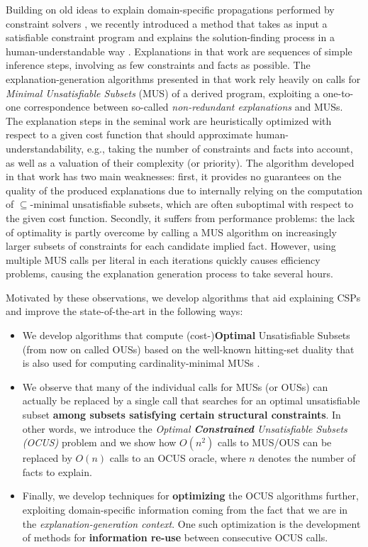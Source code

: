 
Building on old ideas to explain domain-specific propagations performed by constraint solvers  \cite{sqalli1996inference,freuder2001explanation}, we recently introduced a 
method that takes as input a satisfiable constraint program and explains the solution-finding process in a human-understandable way  \cite{ecai/BogaertsGCG20}. 
Explanations in that work are sequences of simple inference steps, involving as few constraints and facts as possible. 
The explanation-generation algorithms presented in that work rely heavily on calls for  \emph{Minimal Unsatisfiable Subsets} (MUS) \cite{marques2010minimal} of a derived program, exploiting a one-to-one correspondence between so-called \emph{non-redundant explanations} and MUSs.
The explanation steps in the seminal work are heuristically optimized with respect to a given cost function that should approximate human-understandability, e.g., taking the number of constraints and facts into account, as well as a valuation of their complexity (or priority). 
The algorithm developed in that work has two main weaknesses: first, it provides no guarantees on the quality of the produced explanations due to internally relying on the computation of $\subseteq$-minimal unsatisfiable subsets, which are often suboptimal with respect to the given cost function. 
Secondly, it suffers from performance problems: the lack of optimality is partly overcome by calling a MUS algorithm on increasingly larger subsets of constraints for each candidate implied fact.
However, using multiple MUS calls per literal in each iterations quickly causes efficiency problems, causing the explanation generation process to take several hours.


Motivated by these observations, we develop algorithms that aid explaining CSPs and improve the state-of-the-art in the following ways: 
\begin{itemize}
 \item We develop algorithms that compute (cost-)\textbf{Optimal} Unsatisfiable Subsets (from now on called OUSs) based on the well-known hitting-set duality that is also used for computing cardinality-minimal MUSs \cite{ignatiev2015smallest,DBLP:conf/kr/SaikkoWJ16}.
\item We observe that many of the individual calls for MUSs (or OUSs) can actually be replaced by a single call that searches for an optimal unsatisfiable subset \textbf{among subsets satisfying certain structural constraints}. In other words, we introduce the \emph{Optimal \textbf{Constrained} Unsatisfiable Subsets (OCUS)} problem and we show how $O(n^2)$ calls to MUS/OUS can be replaced by $O(n)$ calls to an OCUS oracle, where $n$ denotes the number of facts to explain. 
\item Finally, we develop techniques for \textbf{optimizing} the OCUS algorithms further, exploiting domain-specific information coming from the fact that we are in the  \emph{explanation-generation context}. One such optimization is the development of methods for \textbf{information re-use} between consecutive OCUS calls.
\end{itemize}


